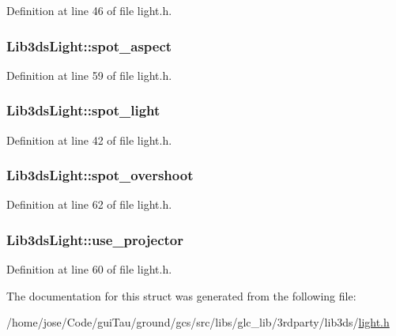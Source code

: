 Definition at line 46 of file light.\-h.

\hypertarget{struct_lib3ds_light_a5a33ad1ae155d2eb9fc87fb878d34f52}{
\subsubsection[{spot\-\_\-aspect}]{ Lib3ds\-Light\-::spot\-\_\-aspect}}\label{struct_lib3ds_light_a5a33ad1ae155d2eb9fc87fb878d34f52}


Definition at line 59 of file light.\-h.

\hypertarget{struct_lib3ds_light_ad2b7e00fd27977ec71562c2ac3ad8665}{
\subsubsection[{spot\-\_\-light}]{ Lib3ds\-Light\-::spot\-\_\-light}}\label{struct_lib3ds_light_ad2b7e00fd27977ec71562c2ac3ad8665}


Definition at line 42 of file light.\-h.

\hypertarget{struct_lib3ds_light_a72b55f772d7f13e5ed645faef9b009b0}{
\subsubsection[{spot\-\_\-overshoot}]{ Lib3ds\-Light\-::spot\-\_\-overshoot}}\label{struct_lib3ds_light_a72b55f772d7f13e5ed645faef9b009b0}


Definition at line 62 of file light.\-h.

\hypertarget{struct_lib3ds_light_a401123e97121d32ec815b9dded68c3ad}{
\subsubsection[{use\-\_\-projector}]{ Lib3ds\-Light\-::use\-\_\-projector}}\label{struct_lib3ds_light_a401123e97121d32ec815b9dded68c3ad}


Definition at line 60 of file light.\-h.



The documentation for this struct was generated from the following file\-:\begin{DoxyCompactItemize}
\item 
/home/jose/\-Code/gui\-Tau/ground/gcs/src/libs/glc\-\_\-lib/3rdparty/lib3ds/\hyperlink{light_8h}{light.\-h}\end{DoxyCompactItemize}
